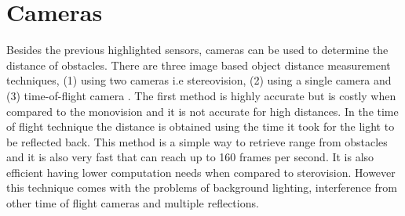 \section{Cameras}
Besides the previous highlighted sensors, cameras can be used to determine the distance of obstacles. There are three image based object distance measurement techniques, (1) using two cameras i.e stereovision, (2) using a single camera and (3) time-of-flight camera \cite{cam}.
The first method is highly accurate but is costly when compared to the monovision and it is not accurate for high distances. In the time of flight technique the distance is obtained using the time it took for the light to be reflected back. This method is a simple way to retrieve range from obstacles and it is also very fast that can reach up to 160 frames per second. It is also efficient having lower computation needs when compared to sterovision. However this technique comes with the problems of background lighting, interference from other time of flight cameras and multiple reflections. 








